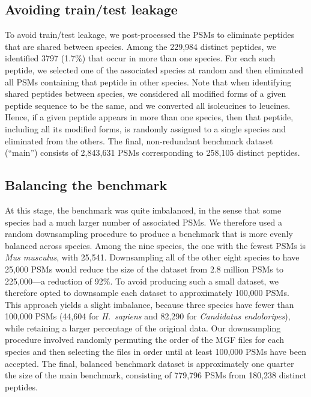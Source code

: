 \documentclass{article}
\begin{document}
\subsection*{Avoiding train/test leakage}

To avoid train/test leakage, we post-processed the PSMs to eliminate peptides that are shared between species.
Among the 229,984 distinct peptides, we identified 3797 (1.7\%) that occur in more than one species.
For each such peptide, we selected one of the associated species at random and then eliminated all PSMs containing that peptide in other species.
Note that when identifying shared peptides between species, we considered all modified forms of a given peptide sequence to be the same, and we converted all isoleucines to leucines.
Hence, if a given peptide appears in more than one species, then that peptide, including all its modified forms, is randomly assigned to a single species and eliminated from the others.
The final, non-redundant benchmark dataset (``main'') consists of 2,843,631 PSMs corresponding to 258,105 distinct peptides.

\subsection*{Balancing the benchmark}

At this stage, the benchmark was quite imbalanced, in the sense that some species had a much larger number of associated PSMs.
We therefore used a random downsampling procedure to produce a benchmark that is more evenly balanced across species.
Among the nine species, the one with the fewest PSMs is \textit{Mus musculus}, with 25,541.
Downsampling all of the other eight species to have 25,000 PSMs would reduce the size of the dataset from 2.8 million PSMs to 225,000---a reduction of 92\%.
To avoid producing such a small dataset, we therefore opted to downsample each dataset to approximately 100,000 PSMs.
This approach yields a slight imbalance, because three species have fewer than 100,000 PSMs (44,604 for \textit{H.\ sapiens} and 82,290 for \textit{Candidatus endoloripes}), while retaining a larger percentage of the original data.
Our downsampling procedure involved randomly permuting the order of the MGF files for each species and then selecting the files in order until at least 100,000 PSMs have been accepted.
The final, balanced benchmark dataset is approximately one quarter the size of the main benchmark, consisting of 779,796 PSMs from 180,238 distinct peptides.
\end{document}

